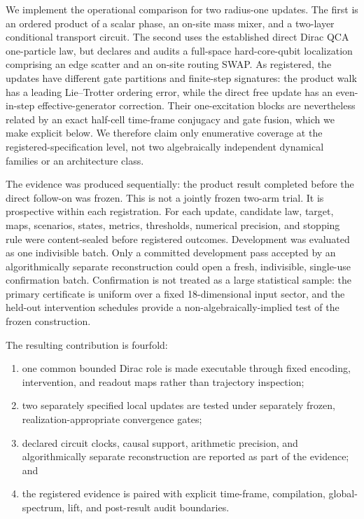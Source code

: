 We implement the operational comparison for two radius-one updates.  The first is
an ordered product of a scalar phase, an on-site mass mixer, and a two-layer
conditional transport circuit.  The second uses the established direct Dirac
QCA one-particle law, but declares and audits a full-space hard-core-qubit
localization comprising an edge scatter and an on-site routing SWAP.  As
registered, the updates have different gate partitions and finite-step
signatures: the product walk has a leading Lie--Trotter ordering error, while
the direct free update has an even-in-step effective-generator correction.
Their one-excitation blocks are nevertheless related by an exact half-cell
time-frame conjugacy and gate fusion, which we make explicit below.  We
therefore claim only enumerative coverage at the registered-specification
level, not two algebraically independent dynamical families or an architecture
class.

The evidence was produced sequentially: the product result completed before
the direct follow-on was frozen.  This is not a jointly frozen two-arm trial.
It is prospective within each registration.  For each update, candidate law,
target, maps, scenarios, states, metrics,
thresholds, numerical precision, and stopping rule were content-sealed before
registered outcomes.  Development was evaluated as one indivisible batch.
Only a committed development pass accepted by an algorithmically separate
reconstruction could open a fresh, indivisible, single-use confirmation
batch.  Confirmation is not treated as a large statistical sample: the
primary certificate is uniform over a fixed 18-dimensional input sector, and
the held-out intervention schedules provide a non-algebraically-implied test
of the frozen construction.

The resulting contribution is fourfold:

\begin{enumerate}
  \item one common bounded Dirac role is made executable through fixed
  encoding, intervention, and readout maps rather than trajectory inspection;
  \item two separately specified local updates are tested under separately
  frozen, realization-appropriate convergence gates;
  \item declared circuit clocks, causal support, arithmetic precision, and
  algorithmically separate reconstruction are reported as part of the
  evidence; and
  \item the registered evidence is paired with explicit time-frame,
  compilation, global-spectrum, lift, and post-result audit boundaries.
\end{enumerate}

